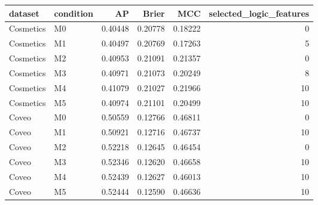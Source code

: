 \begin{tabular}{llrrrr}
\toprule
dataset & condition & AP & Brier & MCC & selected_logic_features \\
\midrule
Cosmetics & M0 & 0.40448 & 0.20778 & 0.18222 & 0 \\
Cosmetics & M1 & 0.40497 & 0.20769 & 0.17263 & 5 \\
Cosmetics & M2 & 0.40953 & 0.21091 & 0.21357 & 0 \\
Cosmetics & M3 & 0.40971 & 0.21073 & 0.20249 & 8 \\
Cosmetics & M4 & 0.41079 & 0.21027 & 0.21966 & 10 \\
Cosmetics & M5 & 0.40974 & 0.21101 & 0.20499 & 10 \\
Coveo & M0 & 0.50559 & 0.12766 & 0.46811 & 0 \\
Coveo & M1 & 0.50921 & 0.12716 & 0.46737 & 10 \\
Coveo & M2 & 0.52218 & 0.12645 & 0.46454 & 0 \\
Coveo & M3 & 0.52346 & 0.12620 & 0.46658 & 10 \\
Coveo & M4 & 0.52439 & 0.12627 & 0.46013 & 10 \\
Coveo & M5 & 0.52444 & 0.12590 & 0.46636 & 10 \\
\bottomrule
\end{tabular}
